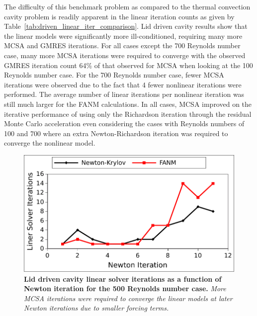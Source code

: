 The difficulty of this benchmark problem as compared to the thermal
convection cavity problem is readily apparent in the linear iteration
counts as given by Table~\ref{tab:driven_linear_iter_comparison}. Lid
driven cavity results show that the linear models were significantly
more ill-conditioned, requiring many more MCSA and GMRES
iterations. For all cases except the 700 Reynolds number case, many
more MCSA iterations were required to converge with the observed GMRES
iteration count 64\% of that observed for MCSA when looking at the 100
Reynolds number case. For the 700 Reynolds number case, fewer MCSA
iterations were observed due to the fact that 4 fewer nonlinear
iterations were performed. The average number of linear iterations per
nonlinear iteration was still much larger for the FANM
calculations. In all cases, MCSA improved on the iterative performance
of using only the Richardson iteration through the residual Monte
Carlo acceleration even considering the cases with Reynolds numbers of
100 and 700 where an extra Newton-Richardson iteration was required to
converge the nonlinear model.

\begin{figure}[t!]
  \begin{center}
    \includegraphics[width=6in]{chapters/nonlinear_problem/driven_re500_iters.pdf}
  \end{center}
  \caption{\textbf{Lid driven cavity linear solver iterations as a
      function of Newton iteration for the 500 Reynolds number case.}
    \textit{More MCSA iterations were required to converge the linear
      models at later Newton iterations due to smaller forcing
      terms.}}
  \label{fig:driven_re500_iters}
\end{figure}

